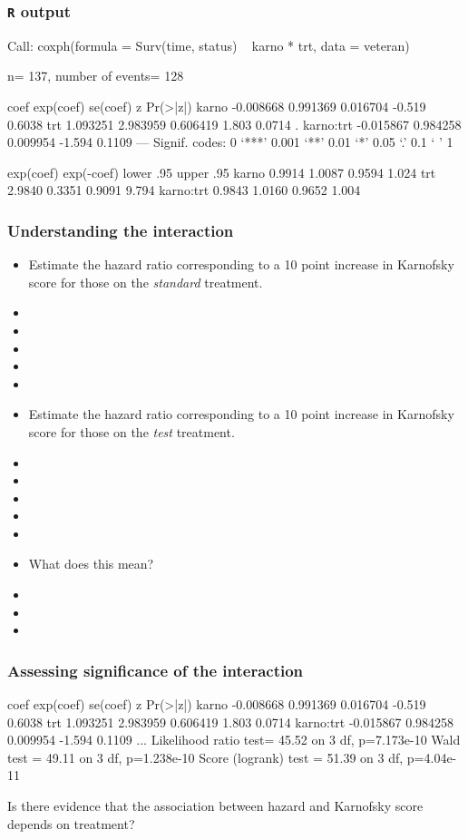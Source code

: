 \begin{frame}[fragile]
\frametitle{\texttt{R} output}
\begin{Rout}{0.0}
Call:
coxph(formula = Surv(time, status) ~ karno * trt, data = veteran)

  n= 137, number of events= 128

               coef exp(coef)  se(coef)      z Pr(>|z|)
karno     -0.008668  0.991369  0.016704 -0.519   0.6038
trt        1.093251  2.983959  0.606419  1.803   0.0714 .
karno:trt -0.015867  0.984258  0.009954 -1.594   0.1109
---
Signif. codes:  0 ‘***’ 0.001 ‘**’ 0.01 ‘*’ 0.05 ‘.’ 0.1 ‘ ’ 1

          exp(coef) exp(-coef) lower .95 upper .95
karno        0.9914     1.0087    0.9594     1.024
trt          2.9840     0.3351    0.9091     9.794
karno:trt    0.9843     1.0160    0.9652     1.004
\end{Rout}
\end{frame}

\begin{frame}
\frametitle{Understanding the interaction}
\begin{itemize}
\item Estimate the hazard ratio corresponding to a 10 point increase in Karnofsky score for those on the \emph{standard} treatment.
\item[]
\item[]
\item[]
\item[]
\item[]
\item Estimate the hazard ratio corresponding to a 10 point increase in Karnofsky score for those on the \emph{test} treatment.
\item[]
\item[]
\item[]
\item[]
\item[]
\item What does this mean?
\item[]
\item[]
\item[]
\end{itemize}
\end{frame}

\begin{frame}[fragile]
\frametitle{Assessing significance of the interaction}
\begin{Rout}{0.0}
               coef exp(coef)  se(coef)      z Pr(>|z|)
karno     -0.008668  0.991369  0.016704 -0.519   0.6038
trt        1.093251  2.983959  0.606419  1.803   0.0714
karno:trt -0.015867  0.984258  0.009954 -1.594   0.1109
...
Likelihood ratio test= 45.52  on 3 df,   p=7.173e-10
Wald test            = 49.11  on 3 df,   p=1.238e-10
Score (logrank) test = 51.39  on 3 df,   p=4.04e-11
\end{Rout}
Is there evidence that the association between hazard and Karnofsky score depends on treatment?
\vskip200pt
\end{frame}

